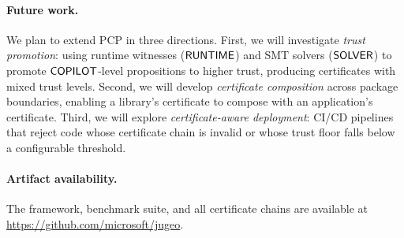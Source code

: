 \documentclass[11pt]{article}
\newcommand{\pcp}{\textsc{PCP}}           %
\begin{document}
\paragraph{Future work.}
We plan to extend \pcp{} in three directions.  First, we will
investigate \emph{trust promotion}: using runtime witnesses
($\mathsf{RUNTIME}$) and SMT solvers ($\mathsf{SOLVER}$) to promote
$\mathsf{COPILOT}$-level propositions to higher trust, producing
certificates with mixed trust levels.  Second, we will develop
\emph{certificate composition} across package boundaries,
enabling a library's certificate to compose with an application's
certificate.  Third, we will explore \emph{certificate-aware
deployment}: CI/CD pipelines that reject code whose certificate
chain is invalid or whose trust floor falls below a configurable
threshold.

\paragraph{Artifact availability.}
The \JuGeo{} framework, benchmark suite, and all certificate
chains are available at \url{https://github.com/microsoft/jugeo}.
\end{document}
